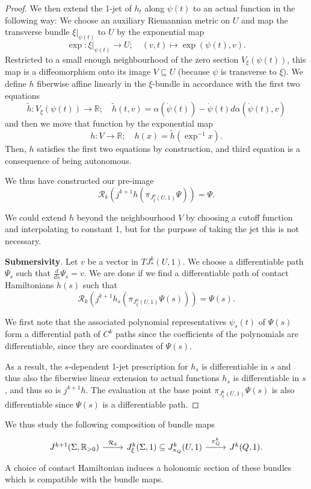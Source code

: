 \documentclass{amsart}
\newcommand{\Rcal}{{\mathcal{R}}}
\newcommand{\RR}{\mathbb{R}}
\theoremstyle{definition}
\theoremstyle{remark}
\numberwithin{equation}{section}
\newcommand{\bparagraph}[1]{\vspace{1em}\noindent\textbf{#1}.\hspace{0.2cm}}
\begin{document}
\begin{proof}
    We then extend the 1-jet of $h_t$ along $\psi(t)$ to an actual function in the following way: We choose an auxiliary Riemannian metric on $U$ and map the transverse bundle $\xi|_{\psi(t)}$ to $U$ by the exponential map 
    $$\exp\colon \xi|_{\psi(t)} \to U;\quad (v, t)\mapsto \exp(\psi(t),v).$$
    Restricted to a small enough neighbourhood of the zero section  $V_\xi(\psi(t))$, this map is a diffeomorphism onto its image $V\subseteq U$ (because $\psi$ is transverse to $\xi$). We define $h$ fiberwise affine linearly in the $\xi$-bundle in accordance with the first two equations
    $$\tilde h\colon V_\xi(\psi(t))\to \RR;\quad \tilde h(t, v) = \alpha(\dot\psi(t)) - \dot\psi(t) d\alpha(\dot\psi(t),v)$$
    and then we move that function by the exponential map
    $$h\colon V\to \RR;\quad h(x) = \tilde h (\exp^{-1} x).$$
    Then, $h$ satisfies the first two equations by construction, and third equation is a consequence of being autonomous.

    We thus have constructed our pre-image 
    $$\Rcal_k(j^{k+1}h(\pi_{J^0_\xi(U,1)}\Psi))=\Psi.$$
    
    We could extend $h$ beyond the neighbourhood $V$ by choosing a cutoff function and interpolating to constant 1, but for the purpose of taking the jet this is not necessary. 

    \bparagraph{Submersivity}
    Let $v$ be a vector in $TJ^k_*(U,1)$. We choose a differentiable path $\Psi_s$ such that $\frac{d}{ds}\Psi_s = v$. We are done if we find a differentiable path of contact Hamiltonians $h(s)$ such that $$\Rcal_k(j^{k+1}h_s(\pi_{J^0_\xi(U,1)}\Psi(s)))=\Psi(s).$$ 

    We first note that the associated polynomial representatives $\psi_s(t)$ of $\Psi(s)$ form a differential path of $C^k$ paths since the coefficients of the polynomials are differentiable, since they are coordinates of $\Psi(s)$.

    As a result, the $s$-dependent 1-jet prescription for $h_s$ is differentiable in $s$ and thus also the fiberwise linear extension to actual functions $h_s$ is differentiable in $s$, and thus so is $j^{k+1}h$. The evaluation at the base point $\pi_{J^k_\xi(U,1)}\Psi(s)$ is also differentiable since $\Psi(s)$ is a differentiable path. 
\end{proof}



We thus study the following composition of bundle maps
\[
  \begin{tikzcd}    
    J^{k+1}(\Sigma,\RR_{>0}) \arrow{r}{\Rcal_k} & J^k_\xi(\Sigma,1)\subseteq J_{\pi_Q}^k(U,1) \arrow{r}{\pi^k_Q}& J^k(Q,1).
  \end{tikzcd}
\]
A choice of contact Hamiltonian induces a holonomic section of these bundles which is compatible with the bundle maps. 
\end{document}
